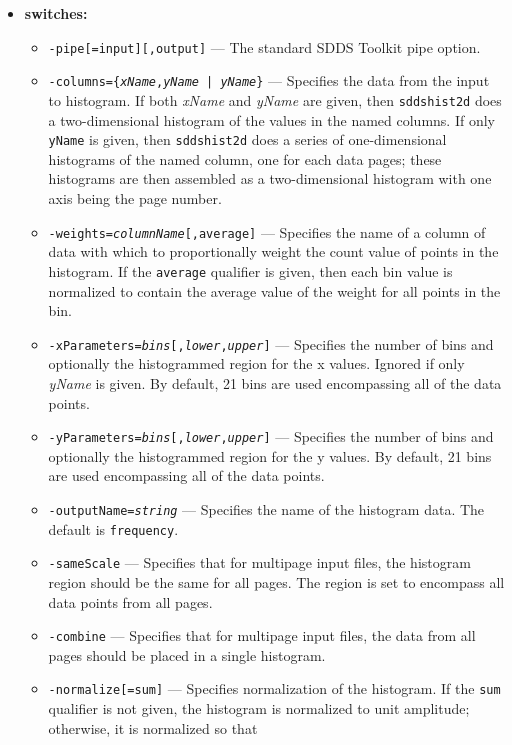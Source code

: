\begin{itemize}
\item {\bf switches:}
    \begin{itemize}
    \item {\tt -pipe[=input][,output]} --- The standard SDDS Toolkit pipe option.
    \item {\tt -columns=\{{\em xName},{\em yName} | {\em yName}\}} --- Specifies the data from
        the input to histogram.  If both {\em xName} and {\em yName} are given, then {\tt sddshist2d}
        does a two-dimensional histogram of the values in the named columns.  If only {\tt yName}
        is given, then {\tt sddshist2d} does a series of one-dimensional histograms of the named
        column, one for each data pages; these histograms are then assembled as a two-dimensional
        histogram with one axis being the page number.
    \item {\tt -weights={\em columnName}[,average]} --- Specifies the name of a column of data with
        which to proportionally weight the count value of points in the histogram.  If the {\tt average}
        qualifier is given, then each bin value is normalized to contain the average value of the weight for
        all points in the bin.
    \item {\tt -xParameters={\em bins}[,{\em lower},{\em upper}]} --- Specifies the number of bins and
        optionally the histogrammed region for the x values.  Ignored if only {\em yName} is given.
        By default, 21 bins are used encompassing all of the data points.
    \item {\tt -yParameters={\em bins}[,{\em lower},{\em upper}]} --- Specifies the number of bins and
        optionally the histogrammed region for the y values.  By default, 21 bins are used encompassing
        all of the data points.
    \item {\tt -outputName={\em string}} --- Specifies the name of the histogram data.  The default
        is {\tt frequency}.
    \item {\tt -sameScale} --- Specifies that for multipage input files, the histogram region should be
        the same for all pages.  The region is set to encompass all data points from all pages.
    \item {\tt -combine} --- Specifies that for multipage input files, the data from all pages should be
        placed in a single histogram.
    \item {\tt -normalize[=sum]} --- Specifies normalization of the histogram.  If the {\tt sum} qualifier
        is not given,  the histogram is normalized to unit amplitude; otherwise, it is normalized so that

\end{itemize}
\end{itemize}
